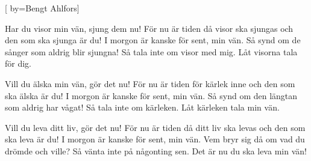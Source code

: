 


[ 	%
	by={Bengt Ahlfors}]		%
	
\beginverse*		%
Har du visor min vän, sjung dem nu!
För nu är tiden då visor ska sjungas
och den som ska sjunga är du!
I morgon är kanske för sent, min vän.
Så synd om de sånger som aldrig blir sjungna!
Så tala inte om visor med mig.
Låt visorna tala för dig. 
\endverse			%

\beginverse*		%
Vill du älska min vän, gör det nu!
För nu är tiden för kärlek inne
och den som ska älska är du!
I morgon är kanske för sent, min vän.
Så synd om den längtan som aldrig har vågat!
Så tala inte om kärleken.
Låt kärleken tala min vän. 
\endverse			%

\beginverse*		%
Vill du leva ditt liv, gör det nu!
För nu är tiden då ditt liv ska levas
och den som ska leva är du!
I morgon är kanske för sent, min vän.
Vem bryr sig då om vad du drömde och ville?
Så vänta inte på någonting sen.
Det är nu du ska leva min vän! 
\endverse			%
\endsong			%
